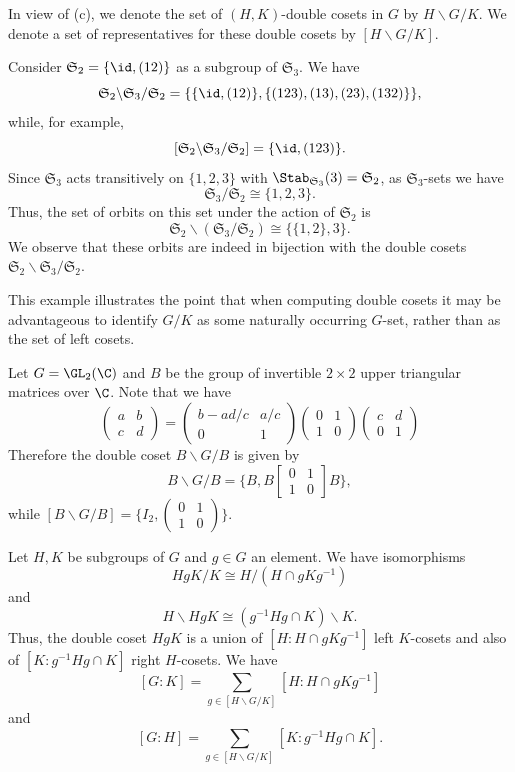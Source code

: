 In view of (c), we denote the set of $(H,K)$-double cosets in $G$ by $H\backslash G/K$. We denote a set of representatives for these double cosets by $[H\backslash G/K]$.
\begin{example}
Consider $\mathfrak{S}_2=\{\id, (12)\}$ as a subgroup of $\mathfrak{S}_3$. We have
\[\mathfrak{S}_2\backslash\mathfrak{S}_3/\mathfrak{S}_2=\{\{\id,(12)\},\{(123),(13),(23),(132)\}\},\]
while, for example,
\[[\mathfrak{S}_2\backslash\mathfrak{S}_3/\mathfrak{S}_2]=\{\id,(123)\}.\]
Since $\mathfrak{S}_3$ acts transitively on $\{1,2,3\}$ with $\Stab_{\mathfrak{S}_3}(3)=\mathfrak{S}_2$, as $\mathfrak{S}_3$-sets we have
\[\mathfrak{S}_3/\mathfrak{S}_2\cong\{1,2,3\}.\]
Thus, the set of orbits on this set under the action of $\mathfrak{S}_2$ is
\[\mathfrak{S}_2\backslash(\mathfrak{S}_3/\mathfrak{S}_2)\cong\{\{1,2\},3\}.\]
We observe that these orbits are indeed in bijection with the double cosets $\mathfrak{S}_2\backslash\mathfrak{S}_3/\mathfrak{S}_2$.
\end{example}
This example illustrates the point that when computing double cosets it may
be advantageous to identify $G/K$ as some naturally occurring $G$-set, rather than as the set of left cosets.
\begin{example}\label{Gl_2 Bruhat decomposition}
Let $G=\GL_2(\C)$ and $B$ be the group of invertible $2\times 2$ upper triangular matrices over $\C$. Note that we have
\[\begin{pmatrix}
a&b\\
c&d
\end{pmatrix}=\begin{pmatrix}
b-ad/c&a/c\\
0&1
\end{pmatrix}\begin{pmatrix}
0&1\\
1&0
\end{pmatrix}\begin{pmatrix}
c&d\\
0&1
\end{pmatrix}\]
Therefore the double coset $B\backslash G/B$ is given by
\[B\backslash G/B=\{B,B\begin{bmatrix}
0&1\\
1&0
\end{bmatrix}B\},\]
while $[B\backslash G/B]=\{I_2,(\begin{smallmatrix}
0&1\\1&0
\end{smallmatrix})\}$.
\end{example}
\begin{proposition}
Let $H,K$ be subgroups of $G$ and $g\in G$ an element. We have isomorphisms
\[HgK/K\cong H/(H\cap gKg^{-1})\]
and
\[H\backslash HgK\cong(g^{-1}Hg\cap K)\backslash K.\]
Thus, the double coset $HgK$ is a union of $[H:H\cap gKg^{-1}]$ left $K$-cosets and also of $[K:g^{-1}Hg\cap K]$ right $H$-cosets. We have
\[[G:K]=\sum_{g\in[H\backslash G/K]}[H:H\cap gKg^{-1}]\]
and
\[[G:H]=\sum_{g\in[H\backslash G/K]}[K:g^{-1}Hg\cap K].\]
\end{proposition}
